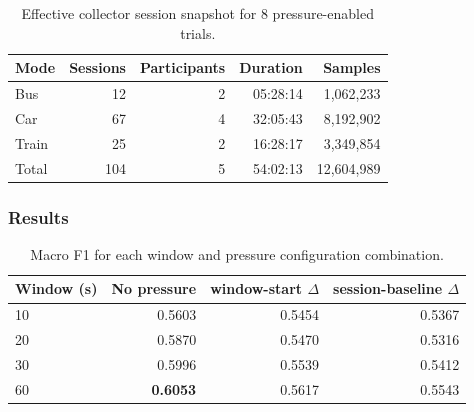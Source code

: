 \begin{table}[htbp]
\centering
\caption{Effective collector session snapshot for 8 pressure-enabled trials.}
\label{tab:aws-run-9c676a2c-effective-collector-snapshot-2}
\begin{tabular}{lrrrr}
\hline
\textbf{Mode} & \textbf{Sessions} & \textbf{Participants} & \textbf{Duration} & \textbf{Samples} \\
\hline
Bus & 12 & 2 & 05:28:14 & 1,062,233 \\
Car & 67 & 4 & 32:05:43 & 8,192,902 \\
Train & 25 & 2 & 16:28:17 & 3,349,854 \\
Total & 104 & 5 & 54:02:13 & 12,604,989 \\
\hline
\end{tabular}
\end{table}


\subsubsection{Results}

\begin{table}[htbp]
\centering
\caption{Macro F1 for each window and pressure configuration combination.}
\label{tab:aws-run-9c676a2c-trial-f1}
\begin{tabular}{lrrr}
\hline
\textbf{Window (s)} & \textbf{No pressure} & \textbf{window-start $\Delta$} & \textbf{session-baseline $\Delta$} \\
\hline
10 & 0.5603 & 0.5454 & 0.5367 \\
20 & 0.5870 & 0.5470 & 0.5316 \\
30 & 0.5996 & 0.5539 & 0.5412 \\
60 & \textbf{0.6053} & 0.5617 & 0.5543 \\
\hline
\end{tabular}
\end{table}


